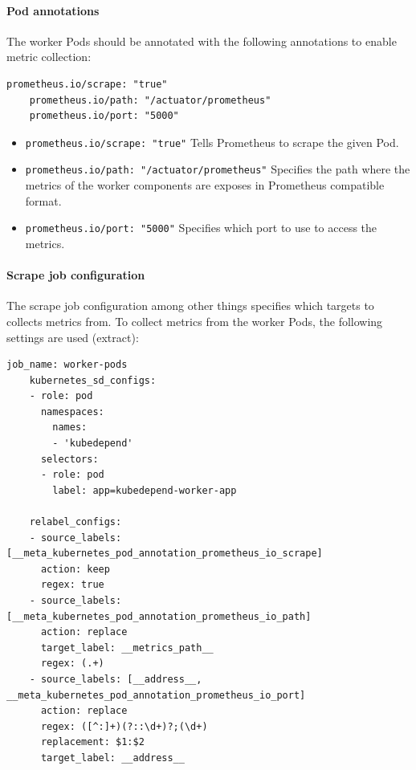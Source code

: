 \paragraph{Pod annotations} The worker Pods should be annotated with the following annotations to enable metric collection:

\vspace{0.5cm}
\begin{minipage}{\linewidth}
	\begin{lstlisting}[caption={Worker annotation to enable monitoring}, label={lst:worker-annotation-monitoring}]
	prometheus.io/scrape: "true"
	prometheus.io/path: "/actuator/prometheus"
	prometheus.io/port: "5000"
	\end{lstlisting}
\end{minipage}

\begin{itemize}
	\item \texttt{prometheus.io/scrape: "true"} Tells Prometheus to scrape the given Pod.
	\item \texttt{prometheus.io/path: "/actuator/prometheus"} Specifies the path where the metrics of the worker components are exposes in Prometheus compatible format.
	\item \texttt{prometheus.io/port: "5000"} Specifies which port to use to access the metrics.
\end{itemize}

\paragraph{Scrape job configuration} The scrape job configuration among other things specifies which targets to collects metrics from. To collect metrics from the worker Pods, the following settings are used (extract):

\vspace{0.5cm}
\begin{minipage}{\linewidth}
	\begin{lstlisting}[caption={Prometheus scrape configuration for worker pods}, label={lst:worker-pods-scrape-job}]
	job_name: worker-pods
	kubernetes_sd_configs:
	- role: pod
	  namespaces:
	    names:
	    - 'kubedepend'
	  selectors:
	  - role: pod
	    label: app=kubedepend-worker-app
	
	relabel_configs:
	- source_labels: [__meta_kubernetes_pod_annotation_prometheus_io_scrape]
	  action: keep
	  regex: true
	- source_labels: [__meta_kubernetes_pod_annotation_prometheus_io_path]
	  action: replace
	  target_label: __metrics_path__
	  regex: (.+)
	- source_labels: [__address__, __meta_kubernetes_pod_annotation_prometheus_io_port]
	  action: replace
	  regex: ([^:]+)(?::\d+)?;(\d+)
	  replacement: $1:$2
	  target_label: __address__\end{lstlisting}
\end{minipage}

